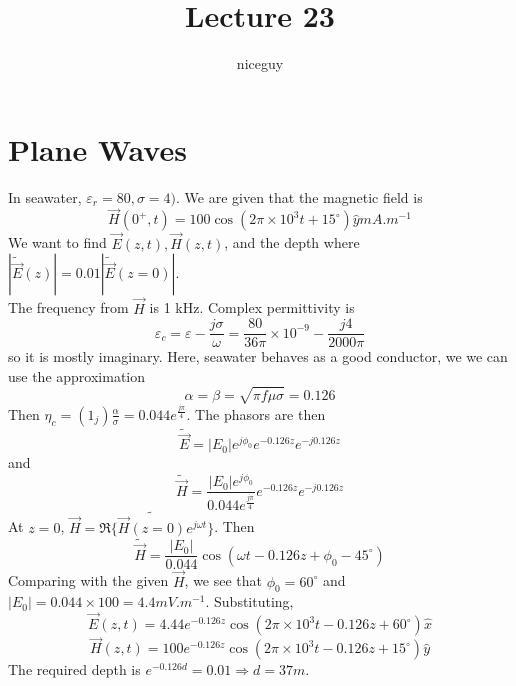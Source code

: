 \documentclass[12pt]{article}
\title{Lecture 23}
\author{niceguy}
\begin{document}
\maketitle

\section{Plane Waves}

\begin{ex}[Seawater]
    In seawater, $\varepsilon_r = 80, \sigma = 4)$. We are given that the magnetic field is
    $$\vec H(0^+,t) = 100\cos(2\pi\times10^3t + 15^\circ)\hat y\unit{mA.m^{-1}}$$
    We want to find $\vec E(z,t), \vec H(z,t)$, and the depth where $|\tilde{\vec E}(z)| = 0.01 |\tilde{\vec E}(z=0)|$. \\
    The frequency from $\vec H$ is 1 kHz. Complex permittivity is
    $$\varepsilon_c = \varepsilon - \frac{j\sigma}{\omega} = \frac{80}{36\pi} \times 10^{-9} - \frac{j4}{2000\pi}$$
    so it is mostly imaginary. Here, seawater behaves as a good conductor, we we can use the approximation
    $$\alpha = \beta = \sqrt{\pi f\mu\sigma} = 0.126$$
    Then $\eta_c = (1_j)\frac{\alpha}{\sigma} = 0.044e^{\frac{j\pi}{4}}$. The phasors are then
    $$\tilde{\vec E} = |E_0|e^{j\phi_0}e^{-0.126z}e^{-j0.126z}$$
    and
    $$\tilde{\vec H} = \frac{|E_0|e^{j\phi_0}}{0.044e^{\frac{j\pi}{4}}}e^{-0.126z}e^{-j0.126z}$$
    At $z = 0$, $\vec H = \Re\{\tilde{\vec H(z=0)}e^{j\omega t}\}$. Then
    $$\tilde{\vec H} = \frac{|E_0|}{0.044}\cos(\omega t - 0.126z + \phi_0 - 45^\circ)$$
    Comparing with the given $\vec H$, we see that $\phi_0 = 60^\circ$ and $|E_0| = 0.044 \times 100 = 4.4\unit{mV.m^{-1}}$. Substituting,
    $$\vec E(z,t) = 4.44e^{-0.126z}\cos(2\pi\times10^3t - 0.126z + 60^\circ)\hat x$$
    $$\vec H(z,t) = 100e^{-0.126z}\cos(2\pi\times10^3t - 0.126z + 15^\circ)\hat y$$
    The required depth is $e^{-0.126d} = 0.01 \Rightarrow d = 37\unit{m}$.
\end{ex}
\end{document}
